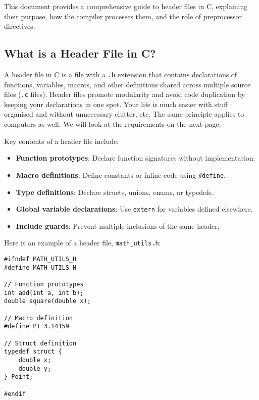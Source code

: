 \documentclass[a4paper,12pt]{article}
\begin{document}
This document provides a comprehensive guide to header files in C, explaining their purpose, how the compiler processes them, and the role of preprocessor directives.

\subsection{What is a Header File in C?}

A header file in C is a file with a \texttt{.h} extension that contains declarations of functions, variables, macros, and other definitions shared across multiple source files (\texttt{.c} files). Header files promote modularity and avoid code duplication by keeping your declarations in one spot. Your life is much easier with stuff organised and without unnecessary clutter, etc. The same principle applies to computers as well. We will look at the requirements on the next page:

\newpage

Key contents of a header file include:
\begin{itemize}[noitemsep]
    \item \textbf{Function prototypes}: Declare function signatures without implementation.
    \item \textbf{Macro definitions}: Define constants or inline code using \texttt{\#define}.
    \item \textbf{Type definitions}: Declare structs, unions, enums, or typedefs.
    \item \textbf{Global variable declarations}: Use \texttt{extern} for variables defined elsewhere.
    \item \textbf{Include guards}: Prevent multiple inclusions of the same header.
\end{itemize}

Here is an example of a header file, \texttt{math\_utils.h}:

\begin{lstlisting}[caption=Example Header File]
#ifndef MATH_UTILS_H
#define MATH_UTILS_H

// Function prototypes
int add(int a, int b);
double square(double x);

// Macro definition
#define PI 3.14159

// Struct definition
typedef struct {
    double x;
    double y;
} Point;

#endif
\end{lstlisting}
\end{document}
